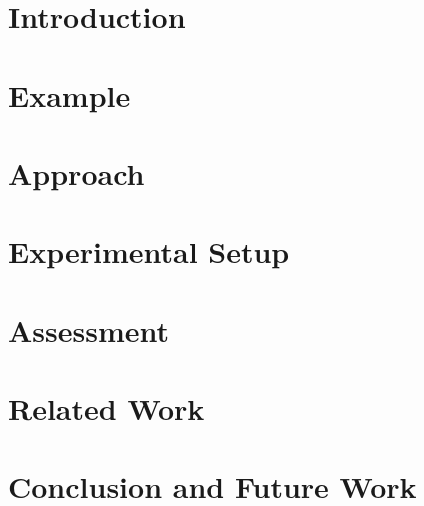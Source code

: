 
\section{Introduction}\label{sec.intro}


\section{Example}\label{sec.example}


\section{Approach}\label{sec.approach}
%

\section{Experimental Setup}\label{sec.experiment}
%

\section{Assessment}\label{sec.threats}
%

\section{Related Work}\label{sec.related}


\section{Conclusion and Future Work} \label{sec.conclusion}
%
